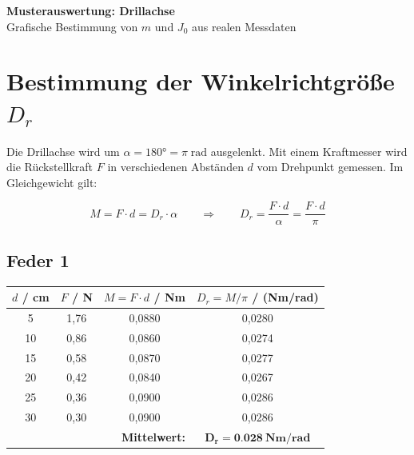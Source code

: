 \documentclass[11pt,a4paper]{scrartcl}
\begin{document}
\begin{center}
	{\LARGE\bfseries Musterauswertung: Drillachse}\\[0.5cm]
	{\large Grafische Bestimmung von $m$ und $J_0$ aus realen Messdaten}
\end{center}

\vspace{0.3cm}

\section*{Bestimmung der Winkelrichtgröße $D_r$}

Die Drillachse wird um $\alpha = 180° = \pi\;\text{rad}$ ausgelenkt.
Mit einem Kraftmesser wird die Rückstellkraft $F$ in verschiedenen Abständen $d$ vom Drehpunkt gemessen.
Im Gleichgewicht gilt:

\begin{formelbox}[title={\faIcon{square-root-alt} Winkelrichtgröße}]
	\[
	M = F \cdot d = D_r \cdot \alpha \qquad\Rightarrow\qquad D_r = \frac{F \cdot d}{\alpha} = \frac{F \cdot d}{\pi}
	\]
\end{formelbox}

\subsection*{Feder 1}

\begin{center}
	\renewcommand{\arraystretch}{1.4}
	\begin{tabular}{|c|c|c|c|}
		\hline
		$d$ / cm & $F$ / N & $M = F \cdot d$ / Nm & $D_r = M/\pi$ / (Nm/rad) \\
		\hline
		5  & 1,76 & 0,0880 & 0,0280 \\
		\hline
		10 & 0,86 & 0,0860 & 0,0274 \\
		\hline
		15 & 0,58 & 0,0870 & 0,0277 \\
		\hline
		20 & 0,42 & 0,0840 & 0,0267 \\
		\hline
		25 & 0,36 & 0,0900 & 0,0286 \\
		\hline
		30 & 0,30 & 0,0900 & 0,0286 \\
		\hline
		\multicolumn{3}{|r|}{\textbf{Mittelwert:}} & $\boldsymbol{D_r = \SI{0,028}{Nm/rad}}$ \\
		\hline
	\end{tabular}
\end{center}
\end{document}
